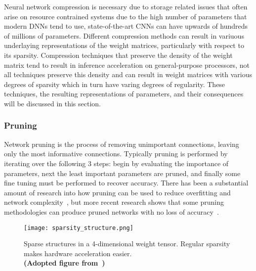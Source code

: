 \documentclass[../../D1.tex]{subfiles}
\begin{document}
Neural network compression is necessary due to storage related issues that often arise on resource contrained systems due to the high number of parameters that modern DNNs tend to use, state-of-the-art CNNs can have upwards of hundreds of millions of parameters. 
Different compression methods can result in variuous underlaying representations of the weight matrices, particularly with respect to its sparsity. 
Compression techniques that preserve the density of the weight matrix tend to result in inference acceleration on general-purpose processors\autocite{lebedevSpeedingupConvolutionalNeural2015,zhangAcceleratingVeryDeep2016}, not all techniques preserve this density and can result in weight matrices with various degrees of sparsity which in turn have varing degrees of regularity. 
These techniques, the resulting representations of parameters, and their consequences will be discussed in this section.

\subsubsection{Pruning}\label{sec:Pruning}
Network pruning is the process of removing unimportant connections, leaving only the most informative connections.
Typically pruning is performed by iterating over the following 3 steps: begin by evaluating the importance of parameters, next the least important parameters are pruned, and finally some fine tuning must be performed to recover accuracy.
There has been a substantial amount of research into how pruning can be used to reduce overfitting and network complexity~\autocite{hansonComparingBiasesMinimal,hassibiSecondOrderDerivatives,lecunOptimalBrainDamage,stromPhonemeProbabilityEstimation1997}, but more recent research shows that some pruning methodologies can produce pruned networks with no loss of accuracy~\autocite{hanLearningBothWeights2015}.

\begin{figure}[H]
    \begin{center}
        \texttt{[image: sparsity\_structure.png]} 
    \end{center}
    
    \caption{Sparse structures in a 4-dimensional weight tensor. Regular sparsity makes hardware acceleration easier.\\ \textbf{(Adopted figure from~\autocite{maoExploringRegularitySparse2017})}}
    \label{fig:SparsityRegularity}   
\end{figure}
\end{document}
